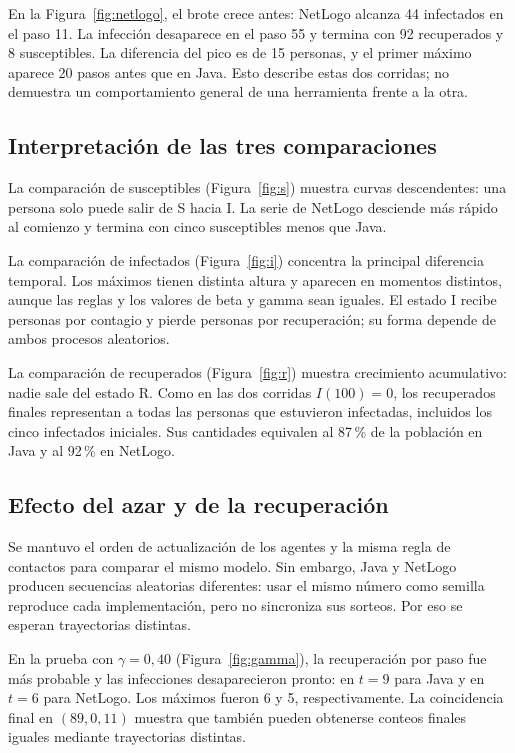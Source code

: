\documentclass[11pt,a4paper]{article}
\begin{document}
En la Figura~\ref{fig:netlogo}, el brote crece antes: NetLogo alcanza 44 infectados en el paso 11. La infección desaparece en el paso 55 y termina con 92 recuperados y 8 susceptibles. La diferencia del pico es de 15 personas, y el primer máximo aparece 20 pasos antes que en Java. Esto describe estas dos corridas; no demuestra un comportamiento general de una herramienta frente a la otra.

\subsection{Interpretación de las tres comparaciones}
La comparación de susceptibles (Figura~\ref{fig:s}) muestra curvas descendentes: una persona solo puede salir de S hacia I. La serie de NetLogo desciende más rápido al comienzo y termina con cinco susceptibles menos que Java.

La comparación de infectados (Figura~\ref{fig:i}) concentra la principal diferencia temporal. Los máximos tienen distinta altura y aparecen en momentos distintos, aunque las reglas y los valores de beta y gamma sean iguales. El estado I recibe personas por contagio y pierde personas por recuperación; su forma depende de ambos procesos aleatorios.

La comparación de recuperados (Figura~\ref{fig:r}) muestra crecimiento acumulativo: nadie sale del estado R. Como en las dos corridas $I(100)=0$, los recuperados finales representan a todas las personas que estuvieron infectadas, incluidos los cinco infectados iniciales. Sus cantidades equivalen al 87\,\% de la población en Java y al 92\,\% en NetLogo.

\subsection{Efecto del azar y de la recuperación}
Se mantuvo el orden de actualización de los agentes y la misma regla de contactos para comparar el mismo modelo. Sin embargo, Java y NetLogo producen secuencias aleatorias diferentes: usar el mismo número como semilla reproduce cada implementación, pero no sincroniza sus sorteos. Por eso se esperan trayectorias distintas.

En la prueba con $\gamma=0{,}40$ (Figura~\ref{fig:gamma}), la recuperación por paso fue más probable y las infecciones desaparecieron pronto: en $t=9$ para Java y en $t=6$ para NetLogo. Los máximos fueron 6 y 5, respectivamente. La coincidencia final en $(89,0,11)$ muestra que también pueden obtenerse conteos finales iguales mediante trayectorias distintas.
\end{document}
